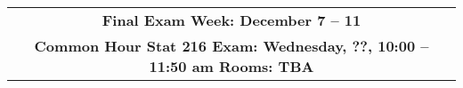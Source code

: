 \begin{center}
\begin{tabular}{|c|c|c|}
  \multicolumn{3}{|c|}{\textbf{Final Exam Week: December 7 -- 11 }} \\
  \multicolumn{3}{|c|}{\bf{ Common Hour Stat 216  Exam: 
      Wednesday, ??, 10:00 -- 11:50 am Rooms: TBA}} \\
\hline

\end{tabular}
\vspace{.2in} \\
\end{center}
%  
